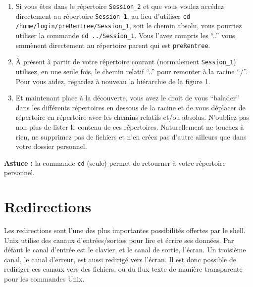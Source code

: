 \documentclass{article}
\begin{document}
\begin{exercice}
\begin{enumerate}
\medskip

\item
Si vous êtes dans le répertoire \texttt{Session\_2} et que vous voulez accédez directement au répertoire \texttt{Session\_1}, au lieu d'utiliser \texttt{cd /home/login/preRentree/Session\_1}, soit le chemin absolu, vous pourriez utiliser la commande  \texttt{cd ../Session\_1}.
Vous l'avez compris les ``..'' vous emmènent directement au répertoire parent qui est \texttt{preRentree}.

\medskip

\item
À présent à partir de votre répertoire courant (normalement \texttt{Session\_1}) utilisez, en une seule fois, le chemin relatif ``..'' pour remonter à la racine ``/''. Pour vous aidez, regardez à nouveau la hiérarchie de la figure 1.

\medskip

\item
Et maintenant place à la découverte, vous avez le droit de vous ``balader'' dans les différents répertoires en dessous de la racine et de vous déplacer de répertoire en répertoire avec les chemins relatifs et/ou absolus. N'oubliez pas non plus de lister le contenu de ces répertoires.
Naturellement ne touchez à rien, ne supprimez pas de fichiers et n'en créez pas d'autre ailleurs que dans votre dossier personnel.

\end{enumerate}

\textbf{Astuce :} la commande \texttt{cd} (seule) permet de retourner à votre répertoire personnel.

\end{exercice}

\hypertarget{Redirections}{%
\section{Redirections}\label{Redirections}}

Les redirections sont l'une des plus importantes possibilités offertes par le shell.
Unix utilise des canaux d'entrées/sorties pour lire et écrire ses données. Par défaut le canal d'entrée est le clavier, et le canal de sortie, l'écran. Un troisième canal, le canal d'erreur, est aussi redirigé vers l'écran.
Il est donc possible de rediriger ces canaux vers des fichiers, ou du flux texte de manière transparente pour les commandes Unix.

\newpage
\end{document}
